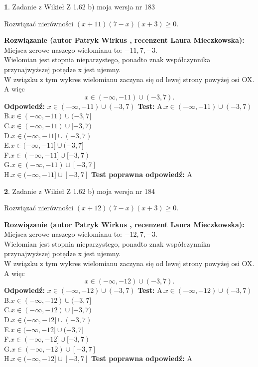 \documentclass[12pt, a4paper]{article}
\theoremstyle{definition} %
\newtheorem{zad}{}
\newcommand{\zadStart}[1]{\begin{zad}#1\newline}
\newcommand{\zadStop}{\end{zad}}
\newcommand{\rozwStart}[2]{\noindent \textbf{Rozwiązanie (autor #1 , recenzent #2): }\newline}
\newcommand{\rozwStop}{\newline}
\newcommand{\odpStart}{\noindent \textbf{Odpowiedź:}\newline}
\newcommand{\odpStop}{\newline}
\newcommand{\testStart}{\noindent \textbf{Test:}\newline}
\newcommand{\testStop}{\newline}
\newcommand{\kluczStart}{\noindent \textbf{Test poprawna odpowiedź:}\newline}
\newcommand{\kluczStop}{\newline}
\begin{document}
\zadStart{Zadanie z Wikieł Z 1.62 b) moja wersja nr 183}

Rozwiązać nierówności $(x+11)(7-x)(x+3)\ge0$.
\zadStop
\rozwStart{Patryk Wirkus}{Laura Mieczkowska}
Miejsca zerowe naszego wielomianu to: $-11, 7, -3$.\\
Wielomian jest stopnia nieparzystego, ponadto znak współczynnika przy\linebreak najwyższej potędze x jest ujemny.\\ W związku z tym wykres wielomianu zaczyna się od lewej strony powyżej osi OX. A więc $$x \in (-\infty,-11) \cup (-3,7).$$
\rozwStop
\odpStart
$x \in (-\infty,-11) \cup (-3,7)$
\odpStop
\testStart
A.$x \in (-\infty,-11) \cup (-3,7)$\\
B.$x \in (-\infty,-11) \cup (-3,7]$\\
C.$x \in (-\infty,-11) \cup [-3,7)$\\
D.$x \in (-\infty,-11] \cup (-3,7)$\\
E.$x \in (-\infty,-11] \cup (-3,7]$\\
F.$x \in (-\infty,-11] \cup [-3,7)$\\
G.$x \in (-\infty,-11) \cup [-3,7]$\\
H.$x \in (-\infty,-11] \cup [-3,7]$
\testStop
\kluczStart
A
\kluczStop



\zadStart{Zadanie z Wikieł Z 1.62 b) moja wersja nr 184}

Rozwiązać nierówności $(x+12)(7-x)(x+3)\ge0$.
\zadStop
\rozwStart{Patryk Wirkus}{Laura Mieczkowska}
Miejsca zerowe naszego wielomianu to: $-12, 7, -3$.\\
Wielomian jest stopnia nieparzystego, ponadto znak współczynnika przy\linebreak najwyższej potędze x jest ujemny.\\ W związku z tym wykres wielomianu zaczyna się od lewej strony powyżej osi OX. A więc $$x \in (-\infty,-12) \cup (-3,7).$$
\rozwStop
\odpStart
$x \in (-\infty,-12) \cup (-3,7)$
\odpStop
\testStart
A.$x \in (-\infty,-12) \cup (-3,7)$\\
B.$x \in (-\infty,-12) \cup (-3,7]$\\
C.$x \in (-\infty,-12) \cup [-3,7)$\\
D.$x \in (-\infty,-12] \cup (-3,7)$\\
E.$x \in (-\infty,-12] \cup (-3,7]$\\
F.$x \in (-\infty,-12] \cup [-3,7)$\\
G.$x \in (-\infty,-12) \cup [-3,7]$\\
H.$x \in (-\infty,-12] \cup [-3,7]$
\testStop
\kluczStart
A
\kluczStop
\end{document}
